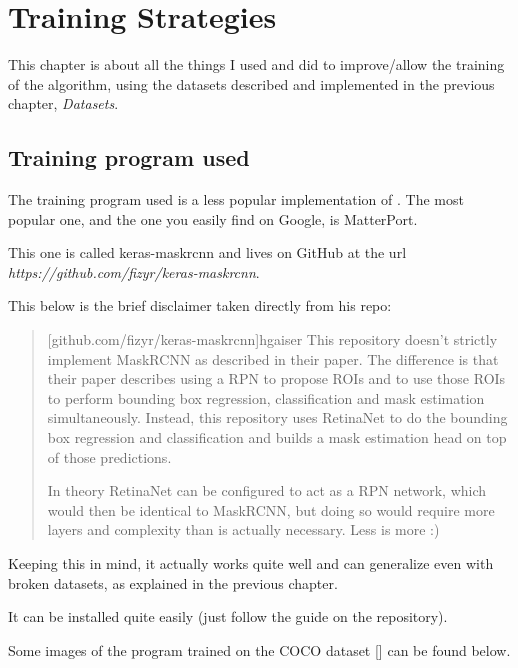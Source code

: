 \chapter{Training Strategies}\label{s:train}

This chapter is about all the things I used and did to improve/allow the training of the algorithm, using the datasets described and implemented in the previous chapter, \emph{Datasets}.

\section{Training program used}\label{s:fizyr}

The training program used is a less popular implementation of \maskrcnn. The most popular one, and the one you easily find on Google, is MatterPort.

This one is called keras-maskrcnn and lives on GitHub at the url \emph{https://github.com/fizyr/keras-maskrcnn}.

This below is the brief disclaimer taken directly from his repo:

\begin{quote}[github.com/fizyr/keras-maskrcnn]{hgaiser}
	This repository doesn't strictly implement MaskRCNN as described in their paper. The difference is that their paper describes using a RPN to propose ROIs and to use those ROIs to perform bounding box regression, classification and mask estimation simultaneously. Instead, this repository uses RetinaNet to do the bounding box regression and classification and builds a mask estimation head on top of those predictions.
	
	In theory RetinaNet can be configured to act as a RPN network, which would then be identical to MaskRCNN, but doing so would require more layers and complexity than is actually necessary. Less is more :)
\end{quote}

Keeping this in mind, it actually works quite well and can generalize even with broken datasets, as explained in the previous chapter.

It can be installed quite easily (just follow the guide on the repository).

Some images of the program trained on the COCO dataset [] can be found below.


